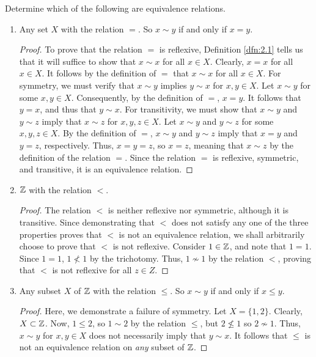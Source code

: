 \documentclass[../main.tex]{subfiles}
\begin{document}
\begin{exercise}\label{exr:2.2}
    Determine which of the following are equivalence relations.
    \begin{enumerate}[label={\alph*)},ref={\theexercise\alph*}]
        \item \label{exr:2.2a}Any set $X$ with the relation $=$. So $x\sim y$ if and only if $x=y$.
        \begin{proof}
            To prove that the relation $=$ is reflexive, Definition \ref{dfn:2.1} tells us that it will suffice to show that $x\sim x$ for all $x\in X$. Clearly, $x=x$ for all $x\in X$. It follows by the definition of $=$ that $x\sim x$ for all $x\in X$. For symmetry, we must verify that $x\sim y$ implies $y\sim x$ for $x,y\in X$. Let $x\sim y$ for some $x,y\in X$. Consequently, by the definition of $=$, $x=y$. It follows that $y=x$, and thus that $y\sim x$. For transitivity, we must show that $x\sim y$ and $y\sim z$ imply that $x\sim z$ for $x,y,z\in X$. Let $x\sim y$ and $y\sim z$ for some $x,y,z\in X$. By the definition of $=$, $x\sim y$ and $y\sim z$ imply that $x=y$ and $y=z$, respectively. Thus, $x=y=z$, so $x=z$, meaning that $x\sim z$ by the definition of the relation $=$. Since the relation $=$ is reflexive, symmetric, and transitive, it is an equivalence relation.
        \end{proof}
        \item \label{exr:2.2b}$\mathbb{Z}$ with the relation $<$.
        \begin{proof}
            The relation $<$ is neither reflexive nor symmetric, although it is transitive. Since demonstrating that $<$ does not satisfy any one of the three properties proves that $<$ is not an equivalence relation, we shall arbitrarily choose to prove that $<$ is not reflexive. Consider $1\in\mathbb{Z}$, and note that $1=1$. Since $1=1$, $1\nless 1$ by the trichotomy. Thus, $1\nsim 1$ by the relation $<$, proving that $<$ is not reflexive for all $z\in Z$.
        \end{proof}
        \item \label{exr:2.2c}Any subset $X$ of $\mathbb{Z}$ with the relation $\leq$. So $x\sim y$ if and only if $x\leq y$.
        \begin{proof}
            Here, we demonstrate a failure of symmetry. Let $X=\{1,2\}$. Clearly, $X\subset\mathbb{Z}$. Now, $1\leq 2$, so $1\sim 2$ by the relation $\leq$, but $2\nleq 1$ so $2\nsim 1$. Thus, $x\sim y$ for $x,y\in X$ does not necessarily imply that $y\sim x$. It follows that $\leq$ is not an equivalence relation on \emph{any} subset of $\mathbb{Z}$.

\end{proof}
\end{enumerate}
\end{exercise}
\end{document}
